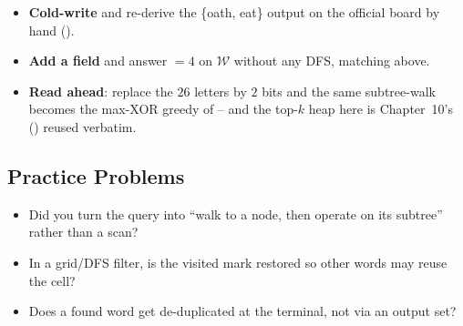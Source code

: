 \begin{hardeningbox}
\begin{itemize}[nosep, leftmargin=1.4em]
  \item \textbf{Cold-write } and re-derive the \{oath, eat\} output on the
        official board by hand ().
  \item \textbf{Add a  field} and answer $=4$ on $\mathcal{W}$ without
        any DFS, matching  above.
  \item \textbf{Read ahead}: replace the $26$ letters by $2$ bits and the same subtree-walk becomes the
        max-XOR greedy of  -- and the top-$k$ heap here is Chapter~10's ()
        reused verbatim.
\end{itemize}
\end{hardeningbox}

\subsection{Practice Problems}

\begin{stuckbox}
\begin{itemize}[nosep, leftmargin=1.4em]
  \item Did you turn the query into ``walk to a node, then operate on its subtree'' rather than a scan?
  \item In a grid/DFS filter, is the visited mark restored so other words may reuse the cell?
  \item Does a found word get de-duplicated at the terminal, not via an output set?
\end{itemize}
\end{stuckbox}


